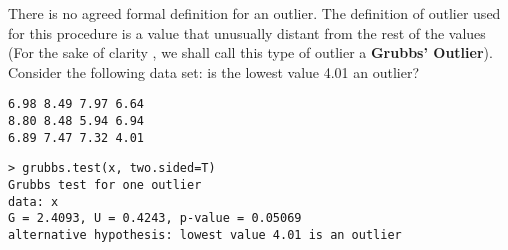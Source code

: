 \documentclass[a4paper,12pt]{article}
\begin{document}
\noindent There is no agreed formal definition for an outlier. The definition of outlier used for this procedure is a value that unusually distant from the rest of the values (For the sake of clarity , we shall call this type of outlier a \textbf{Grubbs' Outlier}). Consider the following data set: is the lowest value 4.01 an outlier?
\begin{center}
\begin{verbatim}
6.98 8.49 7.97 6.64
8.80 8.48 5.94 6.94
6.89 7.47 7.32 4.01
\end{verbatim}
\end{center}


\begin{framed}
\begin{verbatim}
> grubbs.test(x, two.sided=T)
Grubbs test for one outlier
data: x
G = 2.4093, U = 0.4243, p-value = 0.05069
alternative hypothesis: lowest value 4.01 is an outlier
\end{verbatim}
\end{framed}
\end{document}
